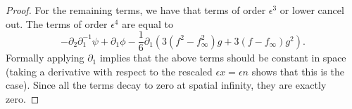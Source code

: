 \begin{proof}
	\iffalse
	\begin{equation}
		\begin{aligned}
			&\epsilon f(\cdot) - \epsilon f(\cdot - \epsilon) - \epsilon^2 \partial_1 F -\epsilon^4\partial_2 F - \frac{\epsilon^3} 6 (f^3(\cdot) - f^3(\cdot - \epsilon)) =\\
			&\begin{aligned}
				&\epsilon^2\partial_1 f &- &\frac{\epsilon^3} 2 \partial_1 f &+ &\frac{\epsilon^4} 6 \partial_1^3f & - & \frac{\epsilon^5}{24} \partial_1^4 f &- & \frac{\epsilon^6} {24} \int_{-1}^0 \partial_1^5 f (\epsilon(n+t+s))(s+1)^4\, ds \\
				-&\epsilon^2\partial_1 f & + & \frac{\epsilon^3} 2 \partial_1^2 f &+& \frac{\epsilon^4}{12} \partial_1(f^3) - \frac{\epsilon^4} 8 \partial_1^3 f & + &  \frac{\epsilon^5}{48} \partial_1^4 f - \frac{\epsilon^5}{24}\partial_1^2(f^3)\\
				&&&& -&\epsilon^4 \partial_2 f & + & \frac{\epsilon^5} 2 \partial_1 \partial_2 f & + & \epsilon^6\partial_2\left(\frac{1} 8 \partial_1^2 f - \frac{1}{12} f^3  - \frac{\epsilon}{48} \partial_1^3 f + \frac{\epsilon} 8 f^2 \partial_1 f\right)\\
				&&&& -&\frac{\epsilon^4} 6 \partial_1(f^3) & + & \frac{\epsilon^5}{12} \partial_1(f^3) & + & \frac{\epsilon^6} {12} \int_{-1}^0 \partial_1^2(f^3)(\epsilon(n+t+s))(s+1)^2\, ds.
			\end{aligned}
		\end{aligned}
	\end{equation}
	All the above terms except the for those of order \(\epsilon^6\).
	\fi
	
	For the remaining terms, we have that terms of order \(\epsilon^3\) or lower cancel out. The terms of order \(\epsilon^4\) are equal to 
	\begin{equation}
		-\partial_2 \partial_1^{-1} \psi+ \partial_1 \phi  - \frac 1 6 \partial_1(3(f^2 - f_\infty^2) g + 3(f-f_\infty) g^2).
	\end{equation}
	Formally applying \(\partial_1\) implies that the above terms should be constant in space (taking a derivative with respect to the rescaled \(\epsilon x = \epsilon n\) shows that this is the case). Since all the terms decay to zero at spatial infinity, they are exactly zero.
	

\end{proof}
